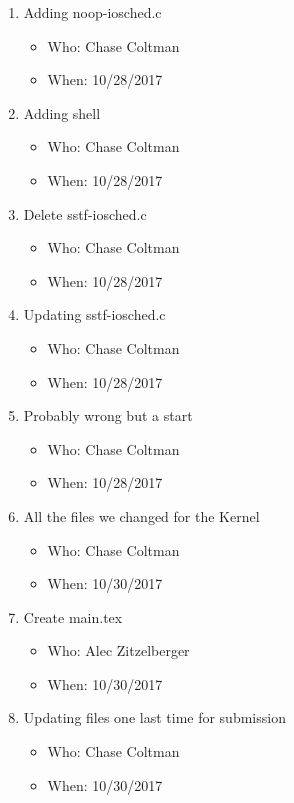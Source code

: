 \documentclass[journal,10pt,onecolumn,compsoc]{IEEEtran} \usepackage[margin=1.0in]{geometry} \usepackage{pdfpages}
\begin{document}
\begin {enumerate}
    \item Adding noop-iosched.c
	\begin {itemize}
        \item Who: Chase Coltman
        \item When: 10/28/2017
	\end {itemize}
    
    \item Adding shell
	\begin {itemize}
        \item Who: Chase Coltman
        \item When: 10/28/2017
	\end {itemize}
    
    \item Delete sstf-iosched.c
	\begin {itemize}
        \item Who: Chase Coltman
        \item When: 10/28/2017
	\end {itemize}
    
    \item Updating sstf-iosched.c
	\begin {itemize}
        \item Who: Chase Coltman
        \item When: 10/28/2017
	\end {itemize}
    
    \item Probably wrong but a start
	\begin {itemize}
        \item Who: Chase Coltman
        \item When: 10/28/2017
	\end {itemize}
    
    \item All the files we changed for the Kernel
	\begin {itemize}
        \item Who: Chase Coltman
        \item When: 10/30/2017
	\end {itemize}
    
    \item Create main.tex
	\begin {itemize}
        \item Who: Alec Zitzelberger
        \item When: 10/30/2017
	\end {itemize}
    
    \item Updating files one last time for submission
	\begin {itemize}
        \item Who: Chase Coltman
        \item When: 10/30/2017
	\end {itemize}
    
\end{enumerate}
\end{document}
